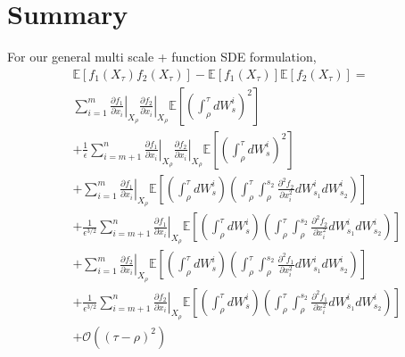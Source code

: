 \documentclass[12pt]{article}
\begin{document}
\section{Summary}

For our general multi scale + function SDE formulation, 
\begin{equation}
\begin{aligned}
&\mathbb{E} \left[ f_1(X_\tau) f_2(X_\tau) \right] - \mathbb{E}[f_1(X_\tau)]\mathbb{E}[f_2(X_\tau)] = \\
& \sum_{i=1}^m \left. \frac{\partial f_1}{\partial x_i} \right|_{X_\rho} \left. \frac{\partial f_2}{\partial x_i} \right|_{X_\rho}  \mathbb{E} \left[ \left( \int_\rho^\tau dW_s^i \right)^2 \right] \\
& + \frac{1}{\epsilon} \sum_{i=m+1}^n \left. \frac{\partial f_1}{\partial x_i} \right|_{X_\rho} \left. \frac{\partial f_2}{\partial x_i} \right|_{X_\rho}  \mathbb{E} \left[ \left( \int_\rho^\tau dW_s^i \right)^2 \right] \\
& + \sum_{i=1}^m \left. \frac{\partial f_1}{\partial x_i} \right|_{X_\rho} \mathbb{E} \left[ \left( \int_\rho^\tau dW_s^i  \right) \left( \int_\rho^\tau \int_\rho^{s_2} \frac{\partial^2 f_2}{\partial x_i^2} dW_{s_1}^i dW_{s_2}^i  \right) \right] \\
& + \frac{1}{\epsilon^{3/2}} \sum_{i=m+1}^n \left. \frac{\partial f_1}{\partial x_i} \right|_{X_\rho} \mathbb{E} \left[ \left( \int_\rho^\tau dW_s^i  \right) \left( \int_\rho^\tau \int_\rho^{s_2} \frac{\partial^2 f_2}{\partial x_i^2} dW_{s_1}^i dW_{s_2}^i  \right) \right] \\
& + \sum_{i=1}^m \left. \frac{\partial f_2}{\partial x_i} \right|_{X_\rho}  \mathbb{E} \left[ \left( \int_\rho^\tau dW_s^i \right)  \left( \int_\rho^\tau \int_\rho^{s_2} \frac{\partial^2 f_1}{\partial x_i^2}  dW_{s_1}^i dW_{s_2}^i \right) \right] \\
& + \frac{1}{\epsilon^{3/2}} \sum_{i=m+1}^n \left. \frac{\partial f_2}{\partial x_i} \right|_{X_\rho}  \mathbb{E} \left[ \left( \int_\rho^\tau dW_s^i \right)  \left( \int_\rho^\tau \int_\rho^{s_2} \frac{\partial^2 f_1}{\partial x_i^2}  dW_{s_1}^i dW_{s_2}^i \right) \right] \\
&+ \mathcal{O} ((\tau - \rho)^2 ) 
\end{aligned}
\end{equation}
\end{document}
